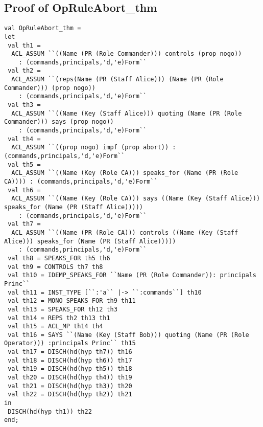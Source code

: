 \documentclass{report}
\begin{document}
\subsection{Proof of OpRuleAbort_thm}
\label{proof-14-2}
\begin{lstlisting}[frame=TBlr]
val OpRuleAbort_thm =
let
 val th1 = 
  ACL_ASSUM ``((Name (PR (Role Commander))) controls (prop nogo))
    : (commands,principals,'d,'e)Form``
 val th2 = 
  ACL_ASSUM ``(reps(Name (PR (Staff Alice))) (Name (PR (Role Commander))) (prop nogo))
    : (commands,principals,'d,'e)Form``
 val th3 = 
  ACL_ASSUM ``((Name (Key (Staff Alice))) quoting (Name (PR (Role Commander))) says (prop nogo))
    : (commands,principals,'d,'e)Form``
 val th4 = 
  ACL_ASSUM ``((prop nogo) impf (prop abort)) : (commands,principals,'d,'e)Form``
 val th5 = 
  ACL_ASSUM ``((Name (Key (Role CA))) speaks_for (Name (PR (Role CA)))) : (commands,principals,'d,'e)Form``
 val th6 = 
  ACL_ASSUM ``((Name (Key (Role CA))) says ((Name (Key (Staff Alice))) speaks_for (Name (PR (Staff Alice)))))
    : (commands,principals,'d,'e)Form``
 val th7 = 
  ACL_ASSUM ``((Name (PR (Role CA))) controls ((Name (Key (Staff Alice))) speaks_for (Name (PR (Staff Alice)))))
    : (commands,principals,'d,'e)Form``
 val th8 = SPEAKS_FOR th5 th6
 val th9 = CONTROLS th7 th8
 val th10 = IDEMP_SPEAKS_FOR ``Name (PR (Role Commander)): principals Princ``
 val th11 = INST_TYPE [``:'a`` |-> ``:commands``] th10
 val th12 = MONO_SPEAKS_FOR th9 th11
 val th13 = SPEAKS_FOR th12 th3
 val th14 = REPS th2 th13 th1
 val th15 = ACL_MP th14 th4
 val th16 = SAYS ``(Name (Key (Staff Bob))) quoting (Name (PR (Role Operator))) :principals Princ`` th15
 val th17 = DISCH(hd(hyp th7)) th16
 val th18 = DISCH(hd(hyp th6)) th17
 val th19 = DISCH(hd(hyp th5)) th18
 val th20 = DISCH(hd(hyp th4)) th19
 val th21 = DISCH(hd(hyp th3)) th20
 val th22 = DISCH(hd(hyp th2)) th21
in
 DISCH(hd(hyp th1)) th22
end;
\end{lstlisting}
\end{document}
